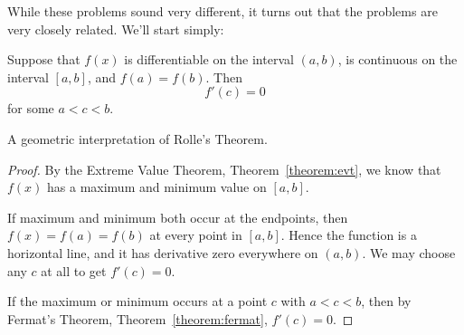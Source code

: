 While these problems sound very different, it turns out that the
problems are very closely related. We'll start simply:

\begin{mainTheorem} 
Suppose that $f(x)$ is differentiable on the interval $(a,b)$, is
continuous on the interval $[a,b]$, and $f(a)=f(b)$. Then 
\[
f'(c)=0
\]
for some $a<c<b$.
\label{thm:rolle}
\end{mainTheorem}
\begin{marginfigure}[0in]
\caption{A geometric interpretation of Rolle's Theorem.}
\label{figure:geoRolle}
\end{marginfigure}
\begin{proof}
By the Extreme Value Theorem, Theorem~\ref{theorem:evt}, we know that
$f(x)$ has a maximum and minimum value on $[a,b]$.

If maximum and minimum both occur at the endpoints, then
$f(x)=f(a)=f(b)$ at every point in $[a,b]$. Hence the function is a
horizontal line, and it has derivative zero everywhere on
$(a,b)$. We may choose any $c$ at all to get $f'(c)=0$.

If the maximum or minimum occurs at a point $c$ with $a<c<b$, then by
Fermat's Theorem, Theorem~\ref{theorem:fermat}, $f'(c)=0$.
\end{proof}

